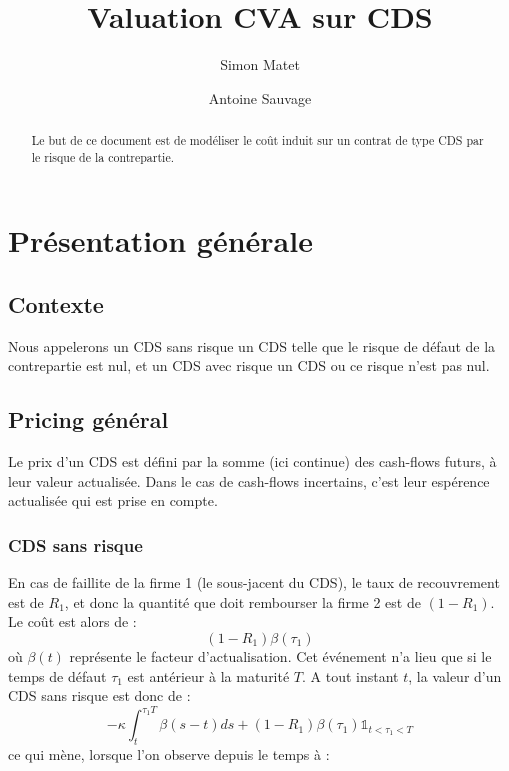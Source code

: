 \documentclass[a4paper]{article}
\title{Valuation CVA sur CDS}           %
\author{Simon Matet \and Antoine Sauvage}
\date{}                       %
\begin{document}
\maketitle                    %

\begin{abstract}
Le but de ce document est de modéliser le coût induit sur un contrat de type CDS par le risque de la contrepartie.
\end{abstract}

\tableofcontents              %


\section{Présentation générale}               %

\subsection{Contexte}         %
Nous appelerons un CDS sans risque un CDS telle que le risque de défaut de la contrepartie est nul, et un CDS avec risque un CDS ou ce risque n'est pas nul.
\subsection{Pricing général}
Le prix d'un CDS est défini par la somme (ici continue) des cash-flows futurs, à leur valeur actualisée.
Dans le cas de cash-flows incertains, c'est leur espérence actualisée qui est prise en compte.
\subsubsection{CDS sans risque}
En cas de faillite de la firme 1 (le sous-jacent du CDS), le taux de recouvrement est de $R_{1}$, et donc la quantité que doit rembourser la firme 2 est de $ (1-R_{1})$.
Le coût est alors de : 
\begin{equation}
(1 - R_{1})\beta (\tau_{1})
\end{equation}
où $\beta(t)$ représente le facteur d'actualisation.
Cet événement n'a lieu que si le temps de défaut $\tau_{1}$ est antérieur à la maturité $T$.
A tout instant $t$, la valeur d'un CDS sans risque est donc de :
\begin{equation}
-\kappa \int_{t}^{\tau_{1} T}\beta(s-t)ds + (1 - R_{1})\beta(\tau_{1})\mathds{1}_{t<\tau_{1}<T}
\end{equation}
ce qui mène, lorsque l'on observe depuis le temps à :
\end{document}

